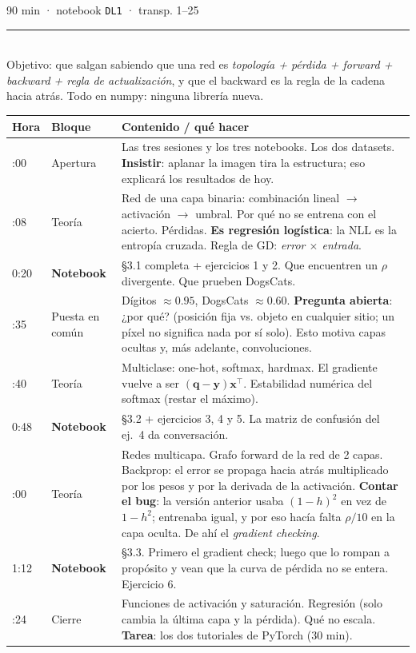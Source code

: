 \documentclass[10pt,a4paper]{article}
\makeatletter
\newcommand{\sesion}[3]{%
  \noindent{\color{uc3m}\large\textbf{#1}}\hfill{\color{uc3m}\small #2}\\[-.3em]
  {\color{uc3m}\rule{\textwidth}{1pt}}\\[.2em]
  {\small #3}\par\vspace{.5em}}
\newenvironment{plan}
  {\small\begin{tabular}{@{}>{\ttfamily}l>{\raggedright\arraybackslash}p{2.1cm}>{\raggedright\arraybackslash}p{10.6cm}@{}}
   \toprule \textrm{\textbf{Hora}} & \textbf{Bloque} & \textbf{Contenido / qué hacer} \\ \midrule}
  {\bottomrule\end{tabular}\par\vspace{.6em}}
\newcommand{\pr}[0]{\cellcolor{accent!15}}
\makeatother
\begin{document}
\sesion{Sesión 1 — Redes neuronales desde cero}{90 min · notebook \texttt{DL1} · transp. 1--25}
{Objetivo: que salgan sabiendo que una red es \emph{topología + pérdida + forward +
backward + regla de actualización}, y que el backward es la regla de la cadena hacia atrás.
Todo en numpy: ninguna librería nueva.}

\begin{plan}
0:00 & Apertura & Las tres sesiones y los tres notebooks. Los dos datasets. \textbf{Insistir}: aplanar la imagen tira la estructura; eso explicará los resultados de hoy. \\
0:08 & Teoría & Red de una capa binaria: combinación lineal $\to$ activación $\to$ umbral. Por qué no se entrena con el acierto. Pérdidas. \textbf{Es regresión logística}: la NLL es la entropía cruzada. Regla de GD: \emph{error $\times$ entrada}. \\
\pr 0:20 & \pr \textbf{Notebook} & \pr §3.1 completa + ejercicios 1 y 2. Que encuentren un $\rho$ divergente. Que prueben DogsCats. \\
0:35 & Puesta en común & Dígitos $\approx0.95$, DogsCats $\approx0.60$. \textbf{Pregunta abierta}: ¿por qué? (posición fija vs. objeto en cualquier sitio; un píxel no significa nada por sí solo). Esto motiva capas ocultas y, más adelante, convoluciones. \\
0:40 & Teoría & Multiclase: one-hot, softmax, hardmax. El gradiente vuelve a ser $(\bm q-\bm y)\bm x^\top$. Estabilidad numérica del softmax (restar el máximo). \\
\pr 0:48 & \pr \textbf{Notebook} & \pr §3.2 + ejercicios 3, 4 y 5. La matriz de confusión del ej.~4 da conversación. \\
1:00 & Teoría & Redes multicapa. Grafo forward de la red de 2 capas. Backprop: el error se propaga hacia atrás multiplicado por los pesos y por la derivada de la activación. \textbf{Contar el bug}: la versión anterior usaba $(1-h)^2$ en vez de $1-h^2$; entrenaba igual, y por eso hacía falta $\rho/10$ en la capa oculta. De ahí el \emph{gradient checking}. \\
\pr 1:12 & \pr \textbf{Notebook} & \pr §3.3. Primero el gradient check; luego que lo rompan a propósito y vean que la curva de pérdida no se entera. Ejercicio 6. \\
1:24 & Cierre & Funciones de activación y saturación. Regresión (solo cambia la última capa y la pérdida). Qué no escala. \textbf{Tarea}: los dos tutoriales de PyTorch (30 min). \\
\end{plan}
\end{document}
